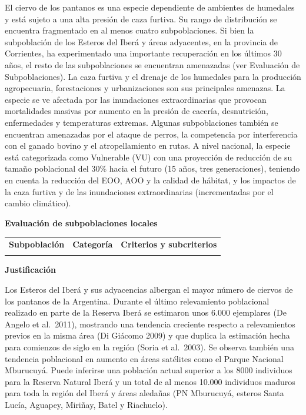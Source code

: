 \documentclass[
  x11names]{article}
\begin{document}
El ciervo de los pantanos es una especie dependiente de ambientes de
humedales y está sujeto a una alta presión de caza furtiva. Su rango de
distribución se encuentra fragmentado en al menos cuatro subpoblaciones.
Si bien la subpoblación de los Esteros del Iberá y áreas adyacentes, en
la provincia de Corrientes, ha experimentado una importante recuperación
en los últimos 30 años, el resto de las subpoblaciones se encuentran
amenazadas (ver Evaluación de Subpoblaciones). La caza furtiva y el
drenaje de los humedales para la producción agropecuaria, forestaciones
y urbanizaciones son sus principales amenazas. La especie se ve afectada
por las inundaciones extraordinarias que provocan mortalidades masivas
por aumento en la presión de cacería, desnutrición, enfermedades y
temperaturas extremas. Algunas subpoblaciones también se encuentran
amenazadas por el ataque de perros, la competencia por interferencia con
el ganado bovino y el atropellamiento en rutas. A nivel nacional, la
especie está categorizada como Vulnerable (VU) con una proyección de
reducción de su tamaño poblacional del 30\% hacia el futuro (15 años,
tres generaciones), teniendo en cuenta la reducción del EOO, AOO y la
calidad de hábitat, y los impactos de la caza furtiva y de las
inundaciones extraordinarias (incrementadas por el cambio climático).

\textbf{Evaluación de subpoblaciones locales}

\begin{tabu} to 
\toprule
\textbf{Subpoblación} & \textbf{Categoría} & \textbf{Criterios y subcriterios}\\
\midrule
{} &  & \\
\bottomrule
\end{tabu}

\textbf{Justificación}

Los Esteros del Iberá y sus adyacencias albergan el mayor número de
ciervos de los pantanos de la Argentina. Durante el último relevamiento
poblacional realizado en parte de la Reserva Iberá se estimaron unos
6.000 ejemplares (De Angelo et al.~2011), mostrando una tendencia
creciente respecto a relevamientos previos en la misma área (Di Giácomo
2009) y que duplica la estimación hecha para comienzos de siglo en la
región (Soria et al.~2003). Se observa también una tendencia poblacional
en aumento en áreas satélites como el Parque Nacional Mburucuyá. Puede
inferirse una población actual superior a los 8000 individuos para la
Reserva Natural Iberá y un total de al menos 10.000 individuos maduros
para toda la región del Iberá y áreas aledañas (PN Mburucuyá, esteros
Santa Lucía, Aguapey, Miriñay, Batel y Riachuelo).
\end{document}
